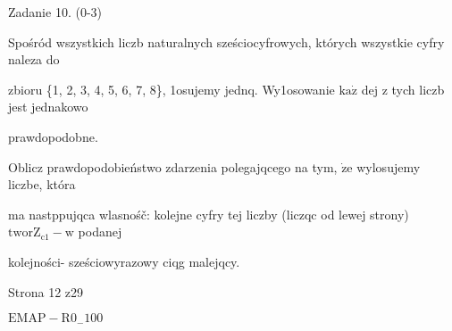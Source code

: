 \documentclass[a4paper,12pt]{article}
\begin{document}
Zadanie 10. (0-3)

Spośród wszystkich liczb naturalnych sześciocyfrowych, których wszystkie cyfry naleza do

zbioru \{1, 2, 3, 4, 5, 6, 7, 8\}, 1osujemy jednq. Wy1osowanie $\mathrm{k}\mathrm{a}\dot{\mathrm{z}}$ dej z tych liczb jest jednakowo

prawdopodobne.

Oblicz prawdopodobieństwo zdarzenia polegajqcego na tym, $\dot{\mathrm{z}}\mathrm{e}$ wylosujemy liczbe, która

ma nastppujqca wlasnośč: kolejne cyfry tej liczby (liczqc od lewej strony) $\mathrm{t}\mathrm{w}\mathrm{o}\mathrm{r}\mathrm{Z}_{\mathrm{c}1}-\mathrm{w}$ podanej

kolejności- sześciowyrazowy ciqg malejqcy.

Strona 12 z29

$\mathrm{E}\mathrm{M}\mathrm{A}\mathrm{P}-\mathrm{R}0_{-}100$
\end{document}
